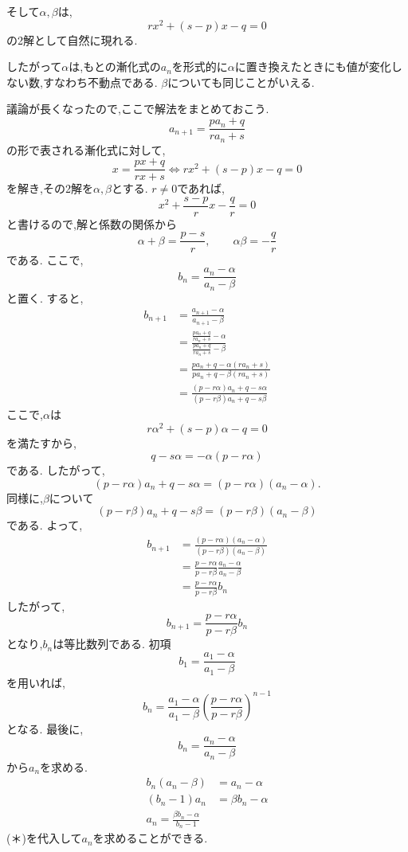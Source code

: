 \documentclass[dvipdfmx,a4paper,11pt,fleqn,openany]{jsbook}
\begin{document}
      そして$\alpha,\beta$は,
      \[
        rx^2+(s-p)x-q=0
      \]
      の2解として自然に現れる.
      
      したがって$\alpha$は,もとの漸化式の$a_n$を形式的に$\alpha$に置き換えたときにも値が変化しない数,すなわち不動点である.
      $\beta$についても同じことがいえる.
      
      議論が長くなったので,ここで解法をまとめておこう.
      \[
        a_{n+1}=\frac{pa_n+q}{ra_n+s} 
      \]
      の形で表される漸化式に対して,
      \[
        x= \frac{px+q}{rx+s} \Leftrightarrow rx^2+(s-p)x-q=0
      \]
      を解き,その2解を$\alpha,\beta$とする.
      $r\neq0$であれば,
      \[
        x^2+\frac{s-p}{r}x-\frac qr=0
      \]
      と書けるので,解と係数の関係から
      \[
        \alpha+\beta=\frac{p-s}{r},
        \qquad
        \alpha\beta=-\frac qr
      \]
      である.
      ここで,
      \[
        b_n=\frac{a_n-\alpha}{a_n-\beta}
      \]
      と置く.
      すると,
      \begin{align*}
        b_{n+1}&=\frac{a_{n+1}-\alpha}{a_{n+1}-\beta}\\
        &=\frac{\displaystyle\frac{pa_n+q}{ra_n+s}-\alpha}{\displaystyle\frac{pa_n+q}{ra_n+s}-\beta}\\
        &=\frac{pa_n+q-\alpha(ra_n+s)}{pa_n+q-\beta(ra_n+s)}\\
        &=\frac{(p-r\alpha)a_n+q-s\alpha}{(p-r\beta)a_n+q-s\beta}
      \end{align*}
      ここで,$\alpha$は
      \[
        r\alpha^2+(s-p)\alpha-q=0
      \]
      を満たすから,
      \[
        q-s\alpha=-\alpha(p-r\alpha)
      \]
      である.
      したがって,
      \[
        (p-r\alpha)a_n+q-s\alpha
        =(p-r\alpha)(a_n-\alpha).
      \]
      同様に,$\beta$について
      \[
        (p-r\beta)a_n+q-s\beta
        =(p-r\beta)(a_n-\beta)
      \]
      である.
      よって,
      \begin{align*}
        b_{n+1}&=\frac{(p-r\alpha)(a_n-\alpha)}{(p-r\beta)(a_n-\beta)}\\
        &=\frac{p-r\alpha}{p-r\beta}\frac{a_n-\alpha}{a_n-\beta}\\
        &=\frac{p-r\alpha}{p-r\beta}b_n
      \end{align*}
      したがって,
      \[
        b_{n+1}=\frac{p-r\alpha}{p-r\beta}b_n
      \]
      となり,$b_n$は等比数列である.
      初項
      \[
        b_1=\frac{a_1-\alpha}{a_1-\beta}
      \]
      を用いれば,
      \[
        b_n=\frac{a_1-\alpha}{a_1-\beta}\left(\frac{p-r\alpha}{p-r\beta}\right)^{n-1} \tag{＊}
      \]
      となる.
      最後に,
      \[
        b_n=\frac{a_n-\alpha}{a_n-\beta}
      \]
      から$a_n$を求める.
      \begin{align*}
        b_n(a_n-\beta)&=a_n-\alpha\\
        (b_n-1)a_n&=\beta b_n-\alpha\\
        a_n=\frac{\beta b_n-\alpha}{b_n-1}
      \end{align*}
      (＊)を代入して$a_n$を求めることができる.
\end{document}

